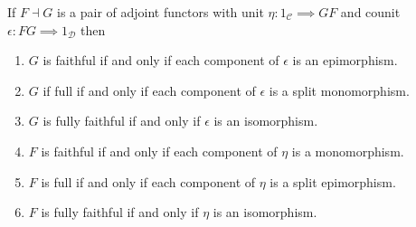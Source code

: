 \begin{lemma}
  \label{lem:adjprops}
  If  $ F \dashv G $ is a pair of adjoint functors with unit $ \eta: 1_\mathcal{C} \implies GF $ and counit $ \epsilon: FG \implies 1_\mathcal{D} $ then
  \begin{enumerate}[label=(\roman*)]
    \item $ G $ is faithful if and only if each component of $ \epsilon $ is an epimorphism.
    \item $ G $ if full if and only if each component of $ \epsilon $ is a split monomorphism.
    \item $ G $ is fully faithful if and only if $ \epsilon $ is an isomorphism.
    \item $ F $ is faithful if and only if each component of $ \eta $ is a monomorphism.
    \item $ F $ is full if and only if each component of $ \eta $ is a split epimorphism.
    \item $ F $ is fully faithful if and only if $ \eta $ is an isomorphism.
  \end{enumerate}
\end{lemma}
